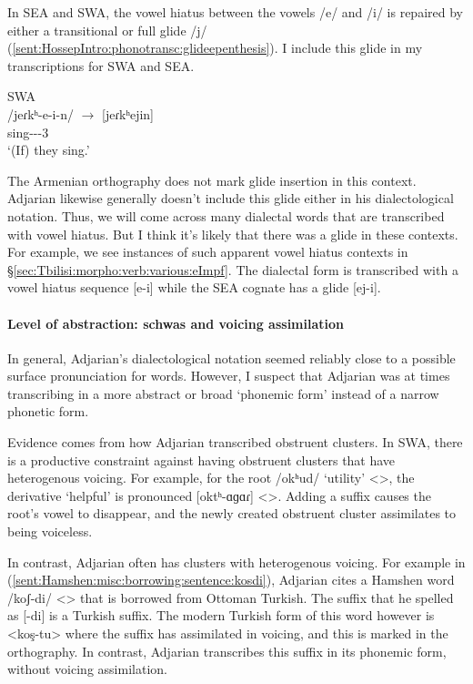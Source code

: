In SEA and SWA, the vowel hiatus between the vowels /e/ and /i/ is repaired by either a transitional or full glide /j/ (\ref{sent:HossepIntro:phonotransc:glideepenthesis}). I include this glide in my transcriptions for SWA and SEA. 

\begin{exe}
	\ex SWA \\
	\gll /jeɾkʰ-e-i-n/ $\rightarrow$ [jeɾkʰejin] \\
	sing-{\thgloss}-{\pst}-3{\pl} \\
	\trans `(If) they sing.' \label{sent:HossepIntro:phonotransc:glideepenthesis}\\
\end{exe}



The Armenian orthography does not mark glide insertion in this context. Adjarian likewise generally doesn't include this glide either in his dialectological notation. Thus, we will come across many dialectal words that are transcribed with vowel hiatus. But I think it's likely  that there was a glide in these  contexts. For example, we see instances of such apparent vowel hiatus contexts in \S\ref{sec:Tbilisi:morpho:verb:various:eImpf}. The dialectal form is transcribed with a vowel hiatus sequence [e-i] while the SEA cognate has a glide [ej-i]. 


\paragraph{Level of abstraction: schwas and   voicing assimilation}\label{sec:HossepIntro:phonotransc:adj:implicit:level of abstraction}

In general, Adjarian's dialectological notation seemed reliably close to a possible surface pronunciation for words. However, I suspect that Adjarian was at times transcribing in a more abstract or broad `phonemic form' instead of a narrow phonetic form. 

Evidence comes from    how Adjarian transcribed obstruent clusters. In SWA, there is a productive constraint against having obstruent clusters that have heterogenous voicing. For example, for the root /okʰud/ `utility' <>, the derivative `helpful' is pronounced [oktʰ-ɑɡɑɾ] <>. Adding a suffix causes the root's vowel to disappear, and the newly created obstruent cluster assimilates to being voiceless. 

In contrast, Adjarian often has clusters with heterogenous voicing. For example in (\ref{sent:Hamshen:misc:borrowing:sentence:kosdi}), Adjarian cites a Hamshen word /koʃ-di/ <> that is borrowed from Ottoman Turkish. The suffix that he spelled as [-di] is a Turkish suffix.  The modern Turkish form of this word however is <koş-tu> where the suffix has assimilated in voicing, and this is marked in the orthography. In contrast, Adjarian transcribes this suffix in its phonemic form, without voicing assimilation.

